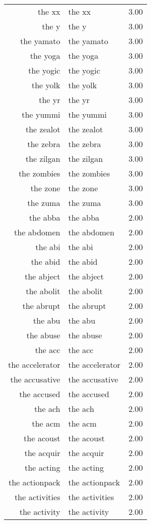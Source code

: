 \begin{table}[ht]
\begin{tabular}{rlr}
  the xx & the xx & 3.00 \\ 
  the y & the y & 3.00 \\ 
  the yamato & the yamato & 3.00 \\ 
  the yoga & the yoga & 3.00 \\ 
  the yogic & the yogic & 3.00 \\ 
  the yolk & the yolk & 3.00 \\ 
  the yr & the yr & 3.00 \\ 
  the yummi & the yummi & 3.00 \\ 
  the zealot & the zealot & 3.00 \\ 
  the zebra & the zebra & 3.00 \\ 
  the zilgan & the zilgan & 3.00 \\ 
  the zombies & the zombies & 3.00 \\ 
  the zone & the zone & 3.00 \\ 
  the zuma & the zuma & 3.00 \\ 
  the abba & the abba & 2.00 \\ 
  the abdomen & the abdomen & 2.00 \\ 
  the abi & the abi & 2.00 \\ 
  the abid & the abid & 2.00 \\ 
  the abject & the abject & 2.00 \\ 
  the abolit & the abolit & 2.00 \\ 
  the abrupt & the abrupt & 2.00 \\ 
  the abu & the abu & 2.00 \\ 
  the abuse & the abuse & 2.00 \\ 
  the acc & the acc & 2.00 \\ 
  the accelerator & the accelerator & 2.00 \\ 
  the accusative & the accusative & 2.00 \\ 
  the accused & the accused & 2.00 \\ 
  the ach & the ach & 2.00 \\ 
  the acm & the acm & 2.00 \\ 
  the acoust & the acoust & 2.00 \\ 
  the acquir & the acquir & 2.00 \\ 
  the acting & the acting & 2.00 \\ 
  the actionpack & the actionpack & 2.00 \\ 
  the activities & the activities & 2.00 \\ 
  the activity & the activity & 2.00 \\ 

\end{tabular}
\end{table}
